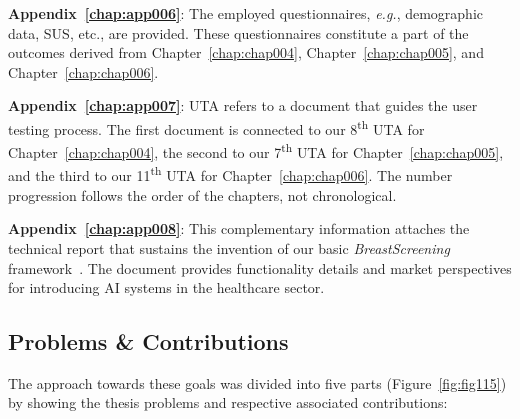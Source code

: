 \vspace{2.00mm}

\noindent
{\bf Appendix~\ref{chap:app006}}:
The employed questionnaires, {\it e.g.}, demographic data, \acs{SUS}, etc., are provided.
These questionnaires constitute a part of the outcomes derived from Chapter~\ref{chap:chap004}, Chapter~\ref{chap:chap005}, and Chapter~\ref{chap:chap006}.

\vspace{2.00mm}

\noindent
{\bf Appendix~\ref{chap:app007}}:
\ac{UTA} refers to a document that guides the user testing process.
The first document is connected to our 8\textsuperscript{th} \ac{UTA} for Chapter~\ref{chap:chap004}, the second to our 7\textsuperscript{th} \ac{UTA} for Chapter~\ref{chap:chap005}, and the third to our 11\textsuperscript{th} \ac{UTA} for Chapter~\ref{chap:chap006}.
The number progression follows the order of the chapters, not chronological.


\vspace{2.00mm}

\noindent
{\bf Appendix~\ref{chap:app008}}:
This complementary information attaches the technical report that sustains the invention of our basic {\it BreastScreening} framework~\cite{10.1145/3399715.3399744, WO2022071818A1}.
The document provides functionality details and market perspectives for introducing \ac{AI} systems in the healthcare sector.

\subsection{Problems \& Contributions}
\label{sec:chap001004004}

\noindent
The approach towards these goals was divided into five parts (Figure~\ref{fig:fig115}) by showing the thesis problems and respective associated contributions:

\vspace{1.00mm}

